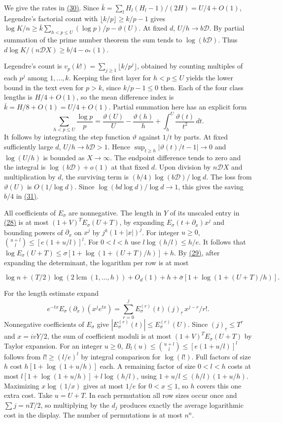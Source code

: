 \documentclass[11pt,a4paper]{article}
\begin{document}
We give the rates in \hyperref[eq:30]{(30)}. Since \(\bar k=\sum_lH_l(H_l-1)/(2H)=U/4+O(1)\), Legendre's factorial count with \(\lfloor k/p\rfloor\ge k/p-1\) gives \(\log K/n\ge\bar k\sum_{h<p\le U}(\log p)/p-\vartheta(U)\). At fixed \(d\), \(U/h\to b\mathscr D\). By partial summation of the prime number theorem the sum tends to \(\log(b\mathscr D)\). Thus \(d\log K/(n\mathscr D X)\ge b/4-o_*(1)\).

Legendre's count is \(v_p(k!)=\sum_{j\ge1}\lfloor k/p^j\rfloor\), obtained by counting multiples of each \(p^j\) among \(1,\ldots,k\). Keeping the first layer for \(h<p\le U\) yields the lower bound in the text even for \(p>k\), since \(k/p-1\le0\) then. Each of the four class lengths is \(H/4+O(1)\), so the mean difference index is \(\bar k=H/8+O(1)=U/4+O(1)\). Partial summation here has an explicit form \[
 \sum_{h<p\le U}\frac{\log p}{p}
 =\frac{\vartheta(U)}U-\frac{\vartheta(h)}h+\int_h^U\frac{\vartheta(t)}{t^2}\,dt .
\] It follows by integrating the step function \(\vartheta\) against \(1/t\) by parts. At fixed sufficiently large \(d\), \(U/h\to b\mathscr D>1\). Hence \(\sup_{t\ge h}|\vartheta(t)/t-1|\to0\) and \(\log(U/h)\) is bounded as \(X\to\infty\). The endpoint difference tends to zero and the integral is \(\log(b\mathscr D)+o(1)\) at that fixed \(d\). Upon division by \(n\mathscr D X\) and multiplication by \(d\), the surviving term is \((b/4)\log(b\mathscr D)/\log d\). The loss from \(\vartheta(U)\) is \(O(1/\log d)\). Since \(\log(bd\log d)/\log d\to1\), this gives the saving \(b/4\) in \hyperref[eq:31]{(31)}.

All coefficients of \(E_\sigma\) are nonnegative. The length in \(Y\) of its unscaled entry in \hyperref[eq:28]{(28)} is at most \((1+V)^T E_\sigma(U+T)\), by expanding \(E_\sigma(t+\partial_x)x^j\) and bounding powers of \(\partial_x\) on \(x^j\) by \(j^k(1+|x|)^j\). For integer \(u\ge0\), \(\binom{u+l}{l}\le [e(1+u/l)]^l\). For \(0<l<h\) use \(l\log(h/l)\le h/e\). It follows that \(\log E_\sigma(U+T)\le\sigma[1+\log(1+(U+T)/h)]+h\). By \hyperref[eq:29]{(29)}, after expanding the determinant, the logarithm per row is at most

\[
 \log n+(T/2)\log(2\operatorname{lcm}(1,\ldots,h))+O_d(1)
       +h+\bar\sigma[1+\log(1+(U+T)/h)] .
\]

For the length estimate expand \[
 e^{-tx}E_\sigma(\partial_x)(x^je^{tx})
   =\sum_{r=0}^j E_\sigma^{(r)}(t)(j)_{\underline r}\,x^{j-r}/r! .
\] Nonnegative coefficients of \(E_\sigma\) give \(|E_\sigma^{(r)}(t)|\le E_\sigma^{(r)}(U)\). Since \((j)_{\underline r}\le T^r\) and \(x=ivY/2\), the sum of coefficient moduli is at most \((1+V)^T E_\sigma(U+T)\) by Taylor expansion. For an integer \(u\ge0\), \(B_l(u)\le\binom{u+l}l\le[e(1+u/l)]^l\) follows from \(l!\ge(l/e)^l\) by integral comparison for \(\log(l!)\). Full factors of size \(h\) cost \(h[1+\log(1+u/h)]\) each. A remaining factor of size \(0<l<h\) costs at most \(l[1+\log(1+u/h)]+l\log(h/l)\), using \(1+u/l\le(h/l)(1+u/h)\). Maximizing \(x\log(1/x)\) gives at most \(1/e\) for \(0<x\le1\), so \(h\) covers this one extra cost. Take \(u=U+T\). In each permutation all row sizes occur once and \(\sum j=nT/2\), so multiplying by the \(d_j\) produces exactly the average logarithmic cost in the display. The number of permutations is at most \(n^n\).
\end{document}
